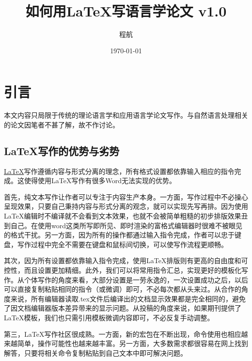 \documentclass[a4paper,12pt]{article}
\title{如何用\LaTeX{}写语言学论文 v1.0}
\author{程航}
\affil{Leiden University Centre for Linguistics}
\date{\today}
\begin{document}
\maketitle

\vspace{20mm}
\tableofcontents


\pagebreak
\vspace{10mm}



\vspace{10mm}
\section{引言}

本文内容只局限于传统的理论语言学和应用语言学论文写作。与自然语言处理相关的论文因笔者不甚了解，故不作讨论。


\subsection{\LaTeX{}写作的优势与劣势}

\href{https://www.latex-project.org/}{\LaTeX{}}写作遵循内容与形式分离的理念，所有格式设置都依靠输入相应的指令完成。这使得使用LaTeX写作有很多Word无法实现的优势。

首先，纯文本写作让作者可以专注于内容生产本身。一方面，写作过程中不必操心呈现效果，只要自己秉持内容与形式分离的观念，就可以实现先写再排。因为使用LaTeX编辑时不编译就不会看到文本效果，也就不会被简单粗糙的初步排版效果丑到自己。在使用word这类所写即所见、即时渲染的富格式编辑器时很难不被眼见的格式干扰。另一方面，因为所有的操作都通过输入指令完成，作者可以忠于键盘，写作过程中完全不需要在键盘和鼠标间切换，可以使写作流程更顺畅。

其次，因为所有设置都依靠输入指令完成，使用LaTeX排版则有更高的自由度和可控性，而且设置更加精细。此外，我们可以将常用指令汇总，实现更好的模板化写作。从个体写作的角度来看，大部分设置是一劳永逸的，一次设置成功之后，以后可以直接复制粘贴相同的指令（或微调）即可，不必每次都从头来过。从合作的角度来说，所有编辑器读取.tex文件后编译出的文档显示效果都是完全相同的，避免了因文档编辑器版本差异带来的显示问题。从投稿的角度来说，如果期刊提供了LaTeX模板，我们也只需引用模板微调内容即可，不必反复手动调整。

第三，LaTeX写作社区很成熟。一方面，新的宏包在不断出现，命令使用也相应越来越简单，操作可能性也越来越丰富。另一方面，大多数需求都很容易在网上找到解答，只要将相关命令复制粘贴到自己文本中即可解决问题。
\end{document}
